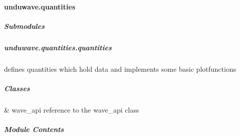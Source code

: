\documentclass[letterpaper,10pt,english]{sphinxmanual}
\begin{document}
\sphinxstepscope


\paragraph{unduwave.quantities}
\label{\detokenize{autoapi/unduwave/quantities/index:module-unduwave.quantities}}\label{\detokenize{autoapi/unduwave/quantities/index:unduwave-quantities}}\label{\detokenize{autoapi/unduwave/quantities/index::doc}}

\subparagraph{Submodules}
\label{\detokenize{autoapi/unduwave/quantities/index:submodules}}
\sphinxstepscope


\subparagraph{unduwave.quantities.quantities}
\label{\detokenize{autoapi/unduwave/quantities/quantities/index:module-unduwave.quantities.quantities}}\label{\detokenize{autoapi/unduwave/quantities/quantities/index:unduwave-quantities-quantities}}\label{\detokenize{autoapi/unduwave/quantities/quantities/index::doc}}
\sphinxAtStartPar
defines quantities which hold data and implements some basic plot\sphinxhyphen{}functions


\subparagraph{Classes}
\label{\detokenize{autoapi/unduwave/quantities/quantities/index:classes}}

\begin{savenotes}\sphinxattablestart
\sphinxthistablewithglobalstyle
\sphinxthistablewithnovlinesstyle
\centering
\begin{tabulary}{\linewidth}[t]{}
\sphinxtoprule
\sphinxtableatstartofbodyhook
\sphinxAtStartPar
{\hyperref[\detokenize{autoapi/unduwave/quantities/quantities/index:unduwave.quantities.quantities.wave_quantity}]{}}
&
\sphinxAtStartPar
wave\_api \sphinxhyphen{} reference to the wave\_api class
\\
\sphinxbottomrule
\end{tabulary}
\sphinxtableafterendhook\par
\sphinxattableend\end{savenotes}


\subparagraph{Module Contents}
\label{\detokenize{autoapi/unduwave/quantities/quantities/index:module-contents}}
\end{document}
